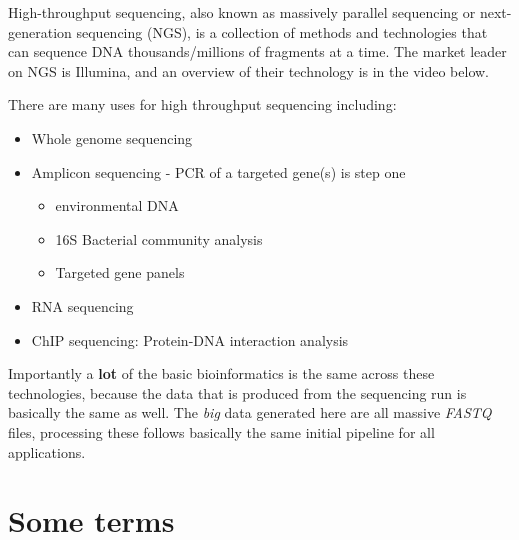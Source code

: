 \documentclass[
]{book}
\providecommand{\tightlist}{%
  \setlength{\itemsep}{0pt}\setlength{\parskip}{0pt}}
\begin{document}
High-throughput sequencing, also known as massively parallel sequencing or next-generation sequencing (NGS), is a collection of methods and technologies that can sequence DNA thousands/millions of fragments at a time. The market leader on NGS is Illumina, and an overview of their technology is in the video below.

There are many uses for high throughput sequencing including:

\begin{itemize}
\item
  Whole genome sequencing
\item
  Amplicon sequencing - PCR of a targeted gene(s) is step one

  \begin{itemize}
  \tightlist
  \item
    environmental DNA
  \item
    16S Bacterial community analysis
  \item
    Targeted gene panels
  \end{itemize}
\item
  RNA sequencing
\item
  ChIP sequencing: Protein-DNA interaction analysis
\end{itemize}

Importantly a \textbf{lot} of the basic bioinformatics is the same across these technologies, because the data that is produced from the sequencing run is basically the same as well. The \emph{big} data generated here are all massive \emph{FASTQ} files, processing these follows basically the same initial pipeline for all applications.

\hypertarget{some-terms-1}{%
\section{Some terms}\label{some-terms-1}}
\end{document}
